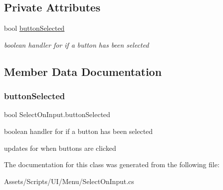 \subsection*{Private Attributes}
\begin{DoxyCompactItemize}
\item 
bool \hyperlink{class_select_on_input_a32ff6bfbb80619aed84e0e66ee1094ab}{button\+Selected}
\begin{DoxyCompactList}\small\item\em boolean handler for if a button has been selected \end{DoxyCompactList}\end{DoxyCompactItemize}


\subsection{Member Data Documentation}
\mbox{\label{class_select_on_input_a32ff6bfbb80619aed84e0e66ee1094ab}} 
\subsubsection{\texorpdfstring{button\+Selected}{buttonSelected}}
{\footnotesize\ttfamily bool Select\+On\+Input.\+button\+Selected\hspace{0.3cm}{\ttfamily [private]}}



boolean handler for if a button has been selected 

updates for when buttons are clicked 

The documentation for this class was generated from the following file\+:\begin{DoxyCompactItemize}
\item 
Assets/\+Scripts/\+U\+I/\+Menu/Select\+On\+Input.\+cs\end{DoxyCompactItemize}
